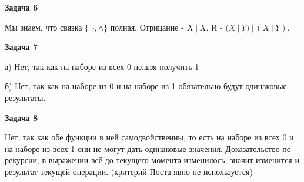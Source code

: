 \begin{center}
\textbf{Задача 6}
\end{center}
Мы знаем, что связка $\displaystyle \{\neg ,\land \}$ полная. Отрицание - $\displaystyle X\ |\ X$, И - $\displaystyle ( X\ |\ Y) \ |\ ( X\ |\ Y)$.

\begin{center}
\textbf{Задача 7}
\end{center}
а) Нет, так как на наборе из всех 0 нельзя получить 1

б) Нет, так как на наборе из 0 и на наборе из 1 обязательно будут одинаковые результаты.

\begin{center}
\textbf{Задача 8}
\end{center}
Нет, так как обе функции в ней самодвойственны, то есть на наборе из всех 0 и на наборе из всех 1 они не могут дать одинаковые значения. Доказательство по рекурсии, в выражении всё до текущего момента изменилось, значит изменится и результат текущей операции. (критерий Поста явно не используется)

